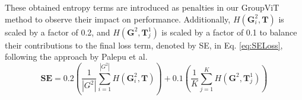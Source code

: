 These obtained entropy terms are introduced as penalties in our GroupViT method to observe their impact on performance. Additionally, \(H(\textbf{G}^2_i, \textbf{T})\) is scaled by a factor of 0.2, and \(H(\textbf{G}^2, \textbf{T}^1_j)\) is scaled by a factor of 0.1 to balance their contributions to the final loss term, denoted by SE, in Eq. \ref{eq:SELoss}, following the approach by Palepu et al.
\begin{equation}
\label{eq:SELoss}
\textbf{SE} = 0.2(\frac{1}{|G^2|} \sum_{i=1}^{|G^2|} H(\textbf{G}_i^2, \textbf{T})
) + 0.1(\frac{1}{K} \sum_{j=1}^{K}H(\textbf{G}^2, \textbf{T}^1_j))
\end{equation}

